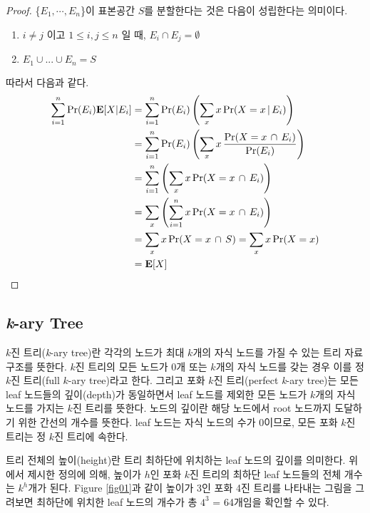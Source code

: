 \documentclass[11pt]{article}
\begin{document}
\singlespacing
\begin{proof}
\{$E_{1}, \cdots , E_{n}$\}이 표본공간 $S$를 분할한다는 것은 다음이 성립한다는 의미이다.
\begin{enumerate}
    \item $i \neq j$ 이고 $1 \le i,j \le n$ 일 때, $E_{i} \cap E_{j} = \emptyset$
    \item $E_{1} \cup ... \cup E_{n} = S$
\end{enumerate}
따라서 다음과 같다.
\[
\begin{split}
\sum_{i=1}^{n} \textnormal{Pr}(E_{i})\textbf{E}[X|E_{i}] & = \sum_{i=1}^{n} \textnormal{Pr}(E_{i}) \left(\sum_{x} x\,\textnormal{Pr}(X = x\,|\,E_{i})\right)\\
& = \sum_{i=1}^{n} \textnormal{Pr}(E_{i}) \left(\sum_{x} x\,\frac{\textnormal{Pr}(X = x\,\cap\,E_{i})}{\textnormal{Pr}(E_{i})}\right)\\
& = \sum_{i=1}^{n} \left(\sum_{x} x\,\textnormal{Pr}(X = x\,\cap\,E_{i})\right)\\
& = \sum_{x} \left(\sum_{i=1}^{n} x\,\textnormal{Pr}(X = x\,\cap\,E_{i})\right)\\
& = \sum_{x} x\,\textnormal{Pr}(X = x\,\cap\,S) = \sum_{x} x\,\textnormal{Pr}(X = x)\\
& = \textbf{E}[X]
\end{split}
\]
\end{proof}
\doublespacing

\subsection{\textit{k}-ary Tree}
$k$진 트리(\textit{k}-ary tree)란 각각의 노드가 최대 $k$개의 자식 노드를 가질 수 있는 트리 자료구조를 뜻한다. $k$진 트리의 모든 노드가 0개 또는 $k$개의 자식 노드를 갖는 경우 이를 정 $k$진 트리(full $k$-ary tree)라고 한다. 그리고 포화 $k$진 트리(perfect \textit{k}-ary tree)는 모든 leaf 노드들의 깊이(depth)가 동일하면서 leaf 노드를 제외한 모든 노드가 $k$개의 자식 노드를 가지는 $k$진 트리를 뜻한다. 노드의 깊이란 해당 노드에서 root 노드까지 도달하기 위한 간선의 개수를 뜻한다. leaf 노드는 자식 노드의 수가 0이므로, 모든 포화 $k$진 트리는 정 $k$진 트리에 속한다.

트리 전체의 높이(height)란 트리 최하단에 위치하는 leaf 노드의 깊이를 의미한다. 위에서 제시한 정의에 의해, 높이가 $h$인 포화 $k$진 트리의 최하단 leaf 노드들의 전체 개수는 $k^h$개가 된다. Figure \ref{fig01}과 같이 높이가 3인 포화 4진 트리를 나타내는 그림을 그려보면 최하단에 위치한 leaf 노드의 개수가 총 $4^3$ = 64개임을 확인할 수 있다.
\end{document}
